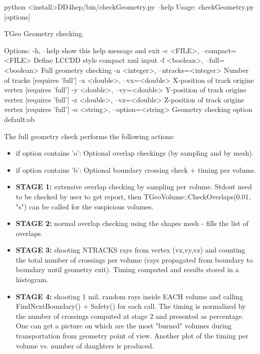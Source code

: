 \documentclass[10pt,a4paper]{article}
\begin{document}
\begin{code}
    python <install>DD4hep/bin/checkGeometry.py --help
    Usage: checkGeometry.py [options]

    TGeo Geometry checking.

    Options:
      -h, --help                            show this help message and exit
      -c <FILE>, --compact=<FILE>           Define LCCDD style compact xml input
      -f <boolean>, --full=<boolean>        Full geometry checking
      -n <integer>, --ntracks=<integer>     Number of tracks [requires 'full']
      -x <double>, --vx=<double>            X-position of track origine vertex [requires 'full']
      -y <double>, --vy=<double>            Y-position of track origine vertex [requires 'full']
      -z <double>, --vz=<double>            Z-position of track origine vertex [requires 'full']
      -o <string>, --option=<string>        Geometry checking option default:ob
\end{code}

The full geometry check performs the 
{following actions}:
\begin{itemize}\itemcompact
\item if option contains 'o': Optional overlap checkings (by sampling and by mesh).
\item if option contains 'b': Optional boundary crossing check + timing per volume.

\item{\bf{STAGE 1:}} extensive overlap checking by sampling per volume. Stdout need to be
  checked by user to get report, then TGeoVolume::CheckOverlaps(0.01, "s") can
  be called for the suspicious volumes.
\item{\bf{STAGE 2:}} normal overlap checking using the shapes mesh - fills the list of
  overlaps.
\item{\bf{STAGE 3:}} shooting NTRACKS rays from vertex (vx,vy,vz) 
   and counting the total number of
  crossings per volume (rays propagated from boundary to boundary until
  geometry exit). Timing computed and results stored in a histogram.
\item{\bf{STAGE 4:}} shooting 1 mil. random rays inside EACH volume and calling
  FindNextBoundary() + Safety() for each call. The timing is normalized by the
  number of crossings computed at stage 2 and presented as percentage.
  One can get a picture on which are the most "burned" volumes during
  transportation from geometry point of view. Another plot of the timing per
  volume vs. number of daughters is produced.
\end{itemize}
\end{document}
